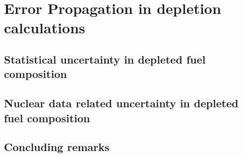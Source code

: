 \chapter{Error Propagation in depletion calculations}

\section{Statistical uncertainty in depleted fuel composition}

\section{Nuclear data related uncertainty in depleted fuel composition}

\section{Concluding remarks}